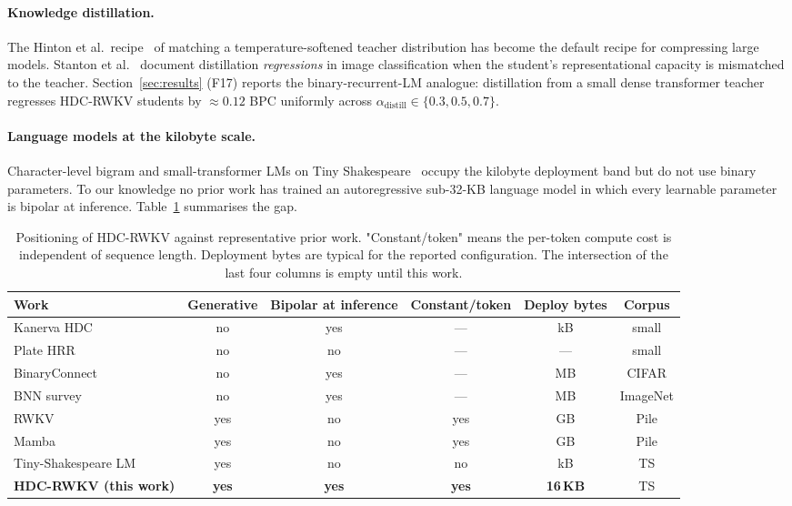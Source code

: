\documentclass[runningheads]{llncs}
\begin{document}
\paragraph{Knowledge distillation.}
The Hinton et al.\ recipe~\cite{hinton2015distilling} of matching a
temperature-softened teacher distribution has become the default recipe
for compressing large models. Stanton et al.~\cite{stanton2021does}
document distillation \emph{regressions} in image classification when
the student's representational capacity is mismatched to the teacher.
Section~\ref{sec:results} (F17) reports the binary-recurrent-LM
analogue: distillation from a small dense transformer teacher
regresses HDC-RWKV students by ${\approx}0.12$ BPC uniformly across
$\alpha_{\mathrm{distill}} \in \{0.3, 0.5, 0.7\}$.

\paragraph{Language models at the kilobyte scale.}
Character-level bigram and small-transformer LMs on
Tiny Shakespeare~\cite{karpathy2015tinyshakespeare} occupy the
kilobyte deployment band but do not use binary parameters. To our
knowledge no prior work has trained an autoregressive sub-32-KB
language model in which every learnable parameter is bipolar at
inference. Table~\ref{tab:related} summarises the gap.

\begin{table}[t]
\centering
\caption{Positioning of HDC-RWKV against representative prior work.
"Constant/token" means the per-token compute cost is independent of
sequence length. Deployment bytes are typical for the reported
configuration. The intersection of the last four columns is empty
until this work.}
\label{tab:related}
\small
\begin{tabular}{@{}lccccc@{}}
\toprule
Work                          & Generative & Bipolar at inference & Constant/token & Deploy bytes & Corpus \\
\midrule
Kanerva HDC~\cite{kanerva2009hyperdimensional}       & no    & yes & --- & kB   & small \\
Plate HRR~\cite{plate1995holographic}                & no    & no  & --- & ---  & small \\
BinaryConnect~\cite{courbariaux2016binaryconnect}    & no    & yes & --- & MB   & CIFAR \\
BNN survey~\cite{qin2020binary}                      & no    & yes & --- & MB   & ImageNet \\
RWKV~\cite{peng2023rwkv}                             & yes   & no  & yes & GB   & Pile \\
Mamba~\cite{gu2023mamba}                             & yes   & no  & yes & GB   & Pile \\
Tiny-Shakespeare LM~\cite{karpathy2015tinyshakespeare} & yes & no  & no  & kB   & TS \\
\textbf{HDC-RWKV (this work)}                        & \textbf{yes} & \textbf{yes} & \textbf{yes} & \textbf{16\,KB} & TS \\
\bottomrule
\end{tabular}
\end{table}
\end{document}

